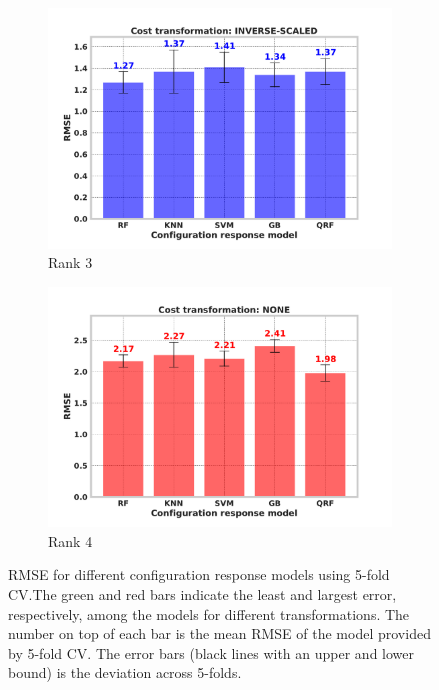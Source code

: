 {\begin{figure}[!htp]
\begin{subfigure}{.47\textwidth}
              \includegraphics[width=\textwidth]{images/rmse-config_3.pdf}
              \caption{Rank 3}
          \end{subfigure}
          \begin{subfigure}{.47\textwidth}
              \centering
              \includegraphics[width=\textwidth]{images/rmse-config_0.pdf}
              \caption{Rank 4}
            \end{subfigure}
\captionsetup{justification=justified}    
\caption[RMSE for configuration response models]{RMSE for different configuration response models using 5-fold CV.The green and red bars indicate the least and largest error, respectively, among the models for different transformations. The number on top of each bar is the mean RMSE of the model provided by 5-fold CV\footnotemark. The error bars (black lines with an upper and lower bound) is the deviation across 5-folds.}
\label{fig:config_response_result}
\end{figure}
}



